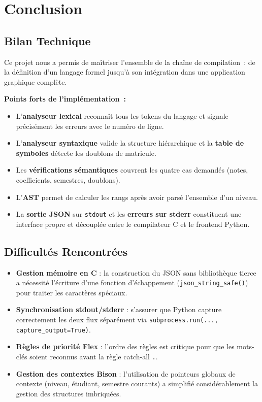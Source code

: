 \documentclass[a4paper,12pt]{article}
\begin{document}
\section{Conclusion}

\subsection{Bilan Technique}

Ce projet nous a permis de maîtriser l'ensemble de la chaîne de compilation~: de la définition d'un langage formel jusqu'à son intégration dans une application graphique complète.

\textbf{Points forts de l'implémentation~:}
\begin{itemize}[leftmargin=1.5em]
  \item L'\textbf{analyseur lexical} reconnaît tous les tokens du langage et signale précisément les erreurs avec le numéro de ligne.
  \item L'\textbf{analyseur syntaxique} valide la structure hiérarchique et la \textbf{table de symboles} détecte les doublons de matricule.
  \item Les \textbf{vérifications sémantiques} couvrent les quatre cas demandés (notes, coefficients, semestres, doublons).
  \item L'\textbf{AST} permet de calculer les rangs après avoir parsé l'ensemble d'un niveau.
  \item La \textbf{sortie JSON} sur \texttt{stdout} et les \textbf{erreurs sur stderr} constituent une interface propre et découplée entre le compilateur C et le frontend Python.
\end{itemize}

\subsection{Difficultés Rencontrées}

\begin{itemize}[leftmargin=1.5em]
  \item \textbf{Gestion mémoire en C} : la construction du JSON sans bibliothèque tierce a nécessité l'écriture d'une fonction d'échappement (\texttt{json\_string\_safe()}) pour traiter les caractères spéciaux.
  \item \textbf{Synchronisation stdout/stderr} : s'assurer que Python capture correctement les deux flux séparément via \texttt{subprocess.run(..., capture\_output=True)}.
  \item \textbf{Règles de priorité Flex} : l'ordre des règles est critique pour que les mots-clés soient reconnus avant la règle catch-all \texttt{.}.
  \item \textbf{Gestion des contextes Bison} : l'utilisation de pointeurs globaux de contexte (niveau, étudiant, semestre courants) a simplifié considérablement la gestion des structures imbriquées.
\end{itemize}
\end{document}
